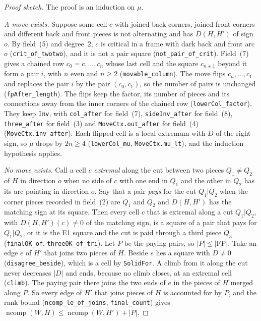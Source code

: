 \documentclass[11pt]{article}
\theoremstyle{plain}
\theoremstyle{definition}
\theoremstyle{remark}
\newcommand{\lean}[1]{\texttt{#1}}
\newcommand{\ncomp}{\operatorname{ncomp}}
\begin{document}
\begin{proof}[Proof sketch]
The proof is an induction on $\mu$.

\emph{A move exists.}
Suppose some cell $c$ with joined back corners, joined front corners and different back and front
pieces is not alternating and has $D(H,H')$ of sign $o$.
By field~(5) and degree~$2$, $c$ is critical in a frame with dark back and front arc $o$
(\lean{crit\_of\_twotwo}), and it is not a pair square (\lean{not\_pair\_of\_crit}).
Field~(7) gives a chained row $c_0=c,\dots,c_n$ whose last cell and the square $c_{n+1}$ beyond it
form a pair $i$, with $n$ even and $n\ge2$ (\lean{movable\_column}).
The move flips $c_n,\dots,c_1$ and replaces the pair $i$ by the pair $(c_0,c_1)$, so the number of
pairs is unchanged (\lean{fpAfter\_length}).
The flips keep the factor, its number of pieces and its connections away from the inner corners of
the chained row (\lean{lowerCol\_factor}).
They keep \lean{Inv}, with \lean{col\_after} for field~(7), \lean{sideInv\_after} for field~(8),
\lean{three\_after} for field~(3) and \lean{MoveCtx.out\_after} for field~(4) (\lean{MoveCtx.inv\_after}).
Each flipped cell is a local extremum with $D$ of the right sign, so $\mu$ drops by $2n\ge4$
(\lean{lowerCol\_mu}, \lean{MoveCtx.mu\_lt}), and the induction hypothesis applies.

\emph{No move exists.}
Call a cell $c$ \emph{extremal} along the cut between two pieces $Q_1\ne Q_2$ of $H$ in direction
$o$ when no side of $c$ with one end in $Q_1$ and the other in $Q_2$ has its arc pointing in
direction $o$.
Say that a pair \emph{pays} for the cut $Q_1|Q_2$ when the corner pieces recorded in field~(2) are
$Q_1$ and $Q_2$ and $D(H,H')$ has the matching sign at its square.
Then every cell $c$ that is extremal along a cut $Q_1|Q_2$, with $D(H,H')(c)\neq0$ of the matching
sign, is a square of a pair that pays for $Q_1|Q_2$, or it is the E1 square and the cut is paid
through a third piece $Q_3$ (\lean{finalOK\_of}, \lean{threeOK\_of\_tri}).
Let $P$ be the paying pairs, so $|P|\le|\mathrm{FP}|$.
Take an edge $e$ of $H'$ that joins two pieces of $H$.
Beside $e$ lies a square with $D\neq0$ (\lean{disagree\_beside}), which is a cell by
\lean{SolidFor}.
A climb from it along the cut never decreases $|D|$ and ends, because no climb closes, at an
extremal cell (\lean{climb}).
The paying pair there joins the two ends of $e$ in the pieces of $H$ merged along $P$.
So every edge of $H'$ that joins pieces of $H$ is accounted for by $P$, and the rank bound
(\lean{ncomp\_le\_of\_joins}, \lean{final\_count}) gives $\ncomp(W,H)\le\ncomp(W,H')+|P|$.
\end{proof}
\end{document}
